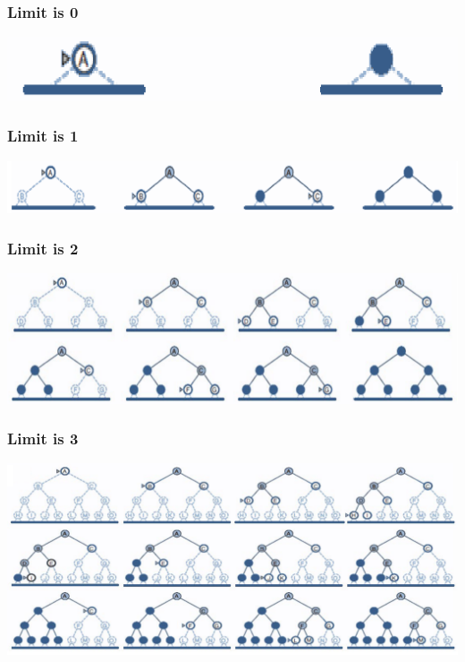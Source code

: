 \documentclass[11pt]{article}
\begin{document}
\subsubsection{Limit is 0}
\label{sec:orgbec35ea}
\begin{center}
\includegraphics[width=.9\linewidth]{./images/iterative-deepening-search-limit-is-zero.png}
\end{center}
\subsubsection{Limit is 1}
\label{sec:orgdc2d7a6}
\begin{center}
\includegraphics[width=.9\linewidth]{./images/iterative-deepening-search-limit-is-one.png}
\end{center}
\subsubsection{Limit is 2}
\label{sec:org2a1c1ae}
\begin{center}
\includegraphics[width=.9\linewidth]{./images/iterative-deepening-search-limit-is-two.png}
\end{center}
\subsubsection{Limit is 3}
\label{sec:org5d4517c}
\begin{center}
\includegraphics[width=.9\linewidth]{./images/iterative-deepening-search-limit-is-three.png}
\end{center}
\end{document}
